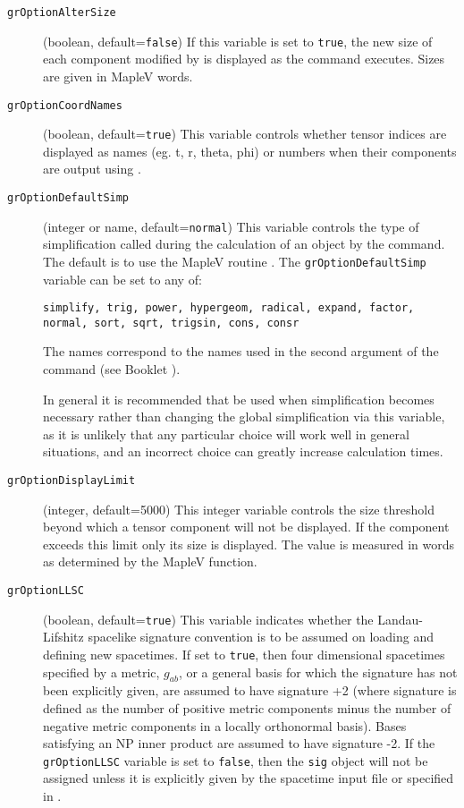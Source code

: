 \documentclass{article}
\begin{document}
\begin{description}
  \item[\texttt{grOptionAlterSize}] (boolean, default=\texttt{false})
    If this variable is set to \texttt{true}, the new size of each
    component modified by  is displayed as the command
    executes.  Sizes are given in MapleV words.

  \item[\texttt{grOptionCoordNames}] (boolean, default=\texttt{true})
    This variable controls whether tensor indices are displayed as
    names (eg. t, r, theta, phi) or numbers when their components
    are output using .

  \item[\texttt{grOptionDefaultSimp}] 
    (integer or name, default=\texttt{normal})
    This variable controls the type of simplification called during the
    calculation of an object by the  command. The default
    is to use the MapleV routine . The
    \texttt{grOptionDefaultSimp} variable can be set to any of:
    \begin{center}
      \texttt{simplify, trig, power, hypergeom, radical, expand, factor,
      normal, sort, sqrt, trigsin, cons, consr}
    \end{center}
    The names correspond to the names used in the second argument
    of the  command (see Booklet \grCalcRef).

    In general it is recommended that  be used when
    simplification becomes necessary rather than changing the global
    simplification via this variable, as it is unlikely that any
    particular choice will work well in general situations, and an
    incorrect choice can greatly increase calculation times.

  \item[\texttt{grOptionDisplayLimit}] (integer, default=5000) This
    integer variable controls the size threshold beyond which a tensor
    component will not be displayed. If the component exceeds this
    limit only its size is displayed. The value is measured in words
    as determined by the MapleV  function.

  \item[\texttt{grOptionLLSC}] (boolean, default=\texttt{true}) This
    variable indicates whether the Landau-Lifshitz spacelike signature
    convention is to be assumed on loading and defining new
    spacetimes.  If set to \texttt{true}, then four dimensional
    spacetimes specified by a metric, $g_{ab}$, or a general basis for
    which the signature has not been explicitly given, are assumed to
    have signature +2 (where signature is defined as the number of
    positive metric components minus the number of negative metric
    components in a locally orthonormal basis). Bases satisfying an NP
    inner product are assumed to have signature -2. If the
    \texttt{grOptionLLSC} variable is set to \texttt{false}, then the
    \texttt{sig} object will not be assigned unless it is explicitly
    given by the spacetime input file or specified in .


\end{description}
\end{document}
